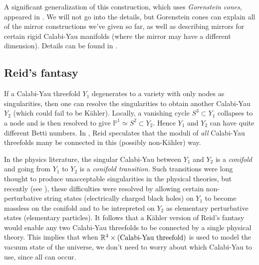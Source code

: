 \documentclass{amsart}
\theoremstyle{plain}
\theoremstyle{definition}
\begin{document}
	A significant generalization of this construction, which uses
{\it Gorenstein cones\/}, appeared in \cite{BB1}.  We will not go into
the details, but Gorenstein cones can explain all of the mirror
constructions we've given so far, as well as describing mirrors for
certain rigid Calabi-Yau manifolds (where the mirror may have a
different dimension).  Details can be found in
\cite{BB1}. 

	\subsection{Reid's fantasy} If a Calabi-Yau threefold
$Y_1$ degenerates to a variety with only nodes as singularities, then
one can resolve the singularities to obtain another Calabi-Yau $Y_2$
(which could fail to be K\"ahler).  Locally, a vanishing cycle $S^3
\subset Y_1$ collapses to a node and is then resolved to give $\mathbb{P}^1 \simeq S^2 \subset Y_2$.  Hence $Y_1$ and $Y_2$ can have quite
different Betti numbers.  In \cite{Rei3}, Reid speculates that the
moduli of {\it all\/} Calabi-Yau threefolds many be connected in this
(possibly non-K\"ahler) way.

	In the physics literature, the singular Calabi-Yau between
$Y_1$ and $Y_2$ is a {\it conifold\/} and going from $Y_1$ to $Y_2$ is
a {\it conifold transition\/}.  Such transitions were long thought to
produce unacceptable singularities in the physical theories, but
recently (see \cite{GMS}), these difficulties were resolved by
allowing certain non-perturbative string states (electrically charged
black holes) on $Y_1$ to become massless on the conifold and to be
intrepreted on $Y_2$ as elementary perturbative states (elementary
particles).  It follows that a K\"ahler version of Reid's fantasy
would enable any two Calabi-Yau threefolds to be connected by a single
physical theory.  This implies that when $\mathbb{R}^4 \times
(\hbox{Calabi-Yau threefold})$ is used to model the vacuum state of
the universe, we don't need to worry about which Calabi-Yau to use,
since all can occur.
\end{document}
